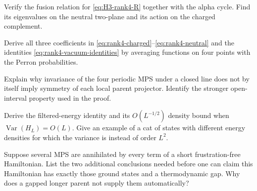 \begin{exercise}\label{ex:gapped-PF}
Verify the fusion relation for \eqref{eq:H3-rank4-R} together with
the alpha cycle. Find its eigenvalues on the neutral two-plane and
its action on the charged complement.

\par\smallskip{}\par
\end{exercise}
\begin{exercise}\label{ex:gapped-cubics}
Derive all three coefficients in
\eqref{eq:rank4-charged}--\eqref{eq:rank4-neutral} and the identities
\eqref{eq:rank4-vacuum-identities} by averaging functions on four
points with the Perron probabilities.

\par\smallskip{}\par
\end{exercise}
\begin{exercise}\label{ex:gapped-parent}
Explain why invariance of the four periodic MPS under a closed line
does not by itself imply symmetry of each local parent projector.
Identify the stronger open-interval property used in the proof.

\par\smallskip{}\par
\end{exercise}
\begin{exercise}\label{ex:gapped-filter}
Derive the filtered-energy identity and its $O(L^{-1/2})$ density
bound when $\operatorname{Var}(H_L)=O(L)$. Give an example of a
cat of states with different energy densities for which the variance
is instead of order $L^2$.

\par\smallskip{}\par
\end{exercise}
\begin{exercise}\label{ex:gapped-short}
Suppose several MPS are annihilated by every term of a short
frustration-free Hamiltonian. List the two additional conclusions
needed before one can claim this Hamiltonian has exactly those
ground states and a thermodynamic gap. Why does a gapped longer
parent not supply them automatically?

\par\smallskip{}\par
\end{exercise}
